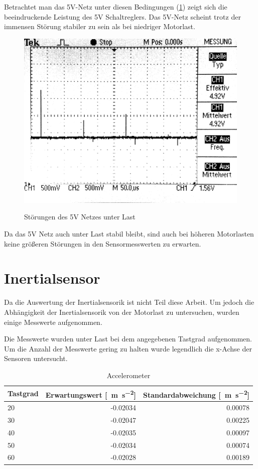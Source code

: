 Betrachtet man das 5V-Netz unter diesen Bedingungen (\cref{fig:5V_last}) zeigt sich die beeindruckende Leistung des 5V Schaltreglers.
Das 5V-Netz scheint trotz der immensen Störung stabiler zu sein als bei niedriger Motorlast. 

\begin{figure}[H]
\centering
\includegraphics[width=.8\textwidth]{5V_LAST.png}\\
\caption{Störungen des 5V Netzes unter Last}%
\label{fig:5V_last}
\end{figure}

Da das 5V Netz auch unter Last stabil bleibt, sind auch bei höheren Motorlasten keine größeren Störungen in den Sensormesswerten zu erwarten.


\section{Inertialsensor}

Da die Auswertung der Inertialsensorik ist nicht Teil diese Arbeit. Um jedoch die Abhängigkeit der Inertialsensorik von der Motorlast
zu untersuchen, wurden einige Messwerte aufgenommen.

Die Messwerte wurden unter Last bei dem angegebenen Tastgrad aufgenommen. Um die Anzahl der Messwerte gering zu halten wurde legendlich die x-Achse der Sensoren untersucht.

\begin{table}[H]
  \centering
  \begin{tabularx}{\textwidth}{|X|r|r|}
    \hline
     Tastgrad & Erwartungswert [\SI{}{\metre\per\second\squared}] & Standardabweichung [\SI{}{\metre\per\second\squared}]  \\ \hline \hline
     20 & -0.02034  & 0.00078 \\ \hline
     30 & -0.02047  & 0.00225 \\ \hline
     40 & -0.02035  & 0.00097 \\ \hline
     50 & -0.02034  & 0.00074 \\ \hline
     60 & -0.02028  & 0.00189 \\ \hline
  \end{tabularx}
  \caption{Accelerometer}%
  \label{tab:acc}
\end{table}

